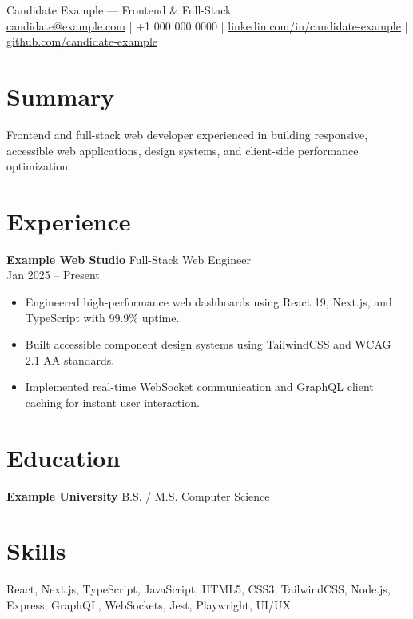 \documentclass[10pt]{article}
\begin{document}
\begin{center}
{\LARGE Candidate Example — Frontend \& Full-Stack}\\
\href{mailto:candidate@example.com}{candidate@example.com} |
+1 000 000 0000 |
\href{https://www.linkedin.com/in/candidate-example}{linkedin.com/in/candidate-example} |
\href{https://github.com/candidate-example}{github.com/candidate-example}
\end{center}

\section*{Summary}
Frontend and full-stack web developer experienced in building responsive, accessible web applications, design systems, and client-side performance optimization.

\section*{Experience}
\textbf{Example Web Studio} \hfill Full-Stack Web Engineer \\
Jan 2025 -- Present
\begin{itemize}
  \item Engineered high-performance web dashboards using React 19, Next.js, and TypeScript with 99.9\% uptime.
  \item Built accessible component design systems using TailwindCSS and WCAG 2.1 AA standards.
  \item Implemented real-time WebSocket communication and GraphQL client caching for instant user interaction.
\end{itemize}

\section*{Education}
\textbf{Example University} \hfill B.S. / M.S. Computer Science

\section*{Skills}
React, Next.js, TypeScript, JavaScript, HTML5, CSS3, TailwindCSS, Node.js, Express, GraphQL, WebSockets, Jest, Playwright, UI/UX
\end{document}
